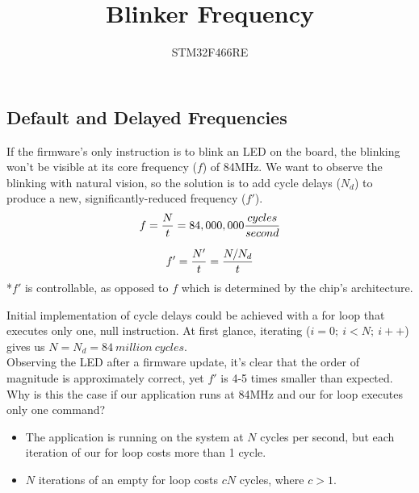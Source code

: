 \documentclass[a4paper,12pt]{article}   	%
\title{Blinker Frequency}
\author{STM32F466RE}
\begin{document}
\maketitle

\subsection*{Default and Delayed Frequencies}
\large
If the firmware's only instruction is to blink an LED on the board,
the blinking won't be visible at its core 
frequency ($f$) of 84MHz. We want to observe the blinking 
with natural vision, so the solution 
is to add cycle delays ($N_d$) to produce a new, 
significantly-reduced frequency ($f'$).\\[1 ex]

$$f = \frac{N}{t} = 84,000,000 \frac{cycles}{second}\\[3 ex]$$

$$f' = \frac{N'}{t} = \frac{N/N_d}{t}\\[3 ex]$$
\large
\normalsize
*$f'$ is controllable, as opposed to $f$ which is determined by the chip's architecture.\\[1 ex]

\large
\begin{flushleft}
Initial implementation of cycle delays could be achieved
with a 
for loop that executes only one, null instruction. At first 
glance, iterating ($i = 0;\ i < N;\ i++$)
gives us $N = N_d = 84\ million\ cycles$.\\[1 ex]

Observing the LED after a firmware update, it's clear that the order of magnitude is approximately correct, 
yet $f'$ is 4-5 times smaller than expected. Why is this the case 
if our application runs at 84MHz and our for loop executes only one command?\\[1 ex]

\end{flushleft}
\begin{itemize}
\setlength{\itemindent}{0.4in}
    \item The application is running on the system at $N$ cycles per second, 
    but each iteration of our for loop 
    costs more than 1 cycle. 
    \item $N$ iterations of an empty for loop costs $cN$ cycles, where $c > 1$.
\end{itemize}
\end{document}
